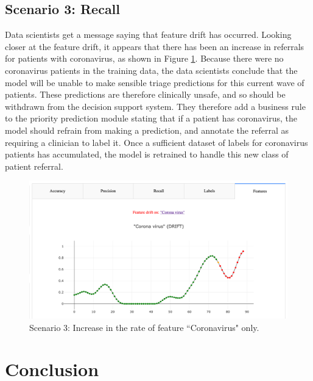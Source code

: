 \subsection{Scenario 3: Recall}

Data scientists get a message saying that feature drift has occurred. 
Looking closer at the feature drift, it appears that there has been an increase in referrals for patients with coronavirus, as shown in Figure \ref{fig:scenario3}.
Because there were no coronavirus patients in the training data, the data scientists conclude that the model will be unable to make sensible triage predictions for this current wave of patients.
These predictions are therefore clinically unsafe, and so should be withdrawn from the decision support system.
They therefore add a business rule to the priority prediction module stating that if a patient has coronavirus, the model should refrain from making a prediction, and annotate the referral as requiring a clinician to label it.
Once a sufficient dataset of labels for coronavirus patients has accumulated, the model is retrained to handle this new class of patient referral. 

\begin{figure}
    \centering
    \includegraphics[width=\textwidth]{images/corona_virus.png}
    \caption{Scenario 3: Increase in the rate of feature ``Coronavirus" only.}
    \label{fig:scenario3}
\end{figure}



\section{Conclusion} \label{mdd:conclusion}

